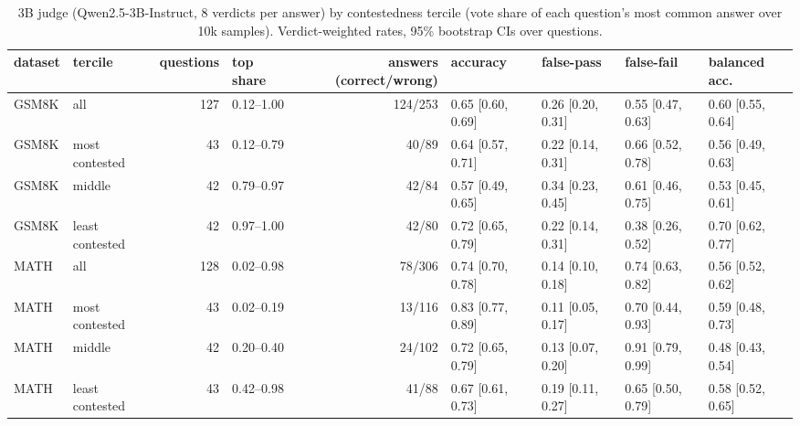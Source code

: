 \begin{table}[t]
\centering
\small
\caption{3B judge (Qwen2.5-3B-Instruct, 8 verdicts per answer) by contestedness tercile (vote share of each question's most common answer over 10k samples). Verdict-weighted rates, 95\% bootstrap CIs over questions.}
\label{tab:judge_terciles}
\begin{tabular}{llrlrllll}
\toprule
dataset & tercile & questions & top share & answers (correct/wrong) & accuracy & false-pass & false-fail & balanced acc. \\
\midrule
GSM8K & all & 127 & 0.12–1.00 & 124/253 & 0.65 [0.60, 0.69] & 0.26 [0.20, 0.31] & 0.55 [0.47, 0.63] & 0.60 [0.55, 0.64] \\
GSM8K & most contested & 43 & 0.12–0.79 & 40/89 & 0.64 [0.57, 0.71] & 0.22 [0.14, 0.31] & 0.66 [0.52, 0.78] & 0.56 [0.49, 0.63] \\
GSM8K & middle & 42 & 0.79–0.97 & 42/84 & 0.57 [0.49, 0.65] & 0.34 [0.23, 0.45] & 0.61 [0.46, 0.75] & 0.53 [0.45, 0.61] \\
GSM8K & least contested & 42 & 0.97–1.00 & 42/80 & 0.72 [0.65, 0.79] & 0.22 [0.14, 0.31] & 0.38 [0.26, 0.52] & 0.70 [0.62, 0.77] \\
MATH & all & 128 & 0.02–0.98 & 78/306 & 0.74 [0.70, 0.78] & 0.14 [0.10, 0.18] & 0.74 [0.63, 0.82] & 0.56 [0.52, 0.62] \\
MATH & most contested & 43 & 0.02–0.19 & 13/116 & 0.83 [0.77, 0.89] & 0.11 [0.05, 0.17] & 0.70 [0.44, 0.93] & 0.59 [0.48, 0.73] \\
MATH & middle & 42 & 0.20–0.40 & 24/102 & 0.72 [0.65, 0.79] & 0.13 [0.07, 0.20] & 0.91 [0.79, 0.99] & 0.48 [0.43, 0.54] \\
MATH & least contested & 43 & 0.42–0.98 & 41/88 & 0.67 [0.61, 0.73] & 0.19 [0.11, 0.27] & 0.65 [0.50, 0.79] & 0.58 [0.52, 0.65] \\
\bottomrule
\end{tabular}
\end{table}
